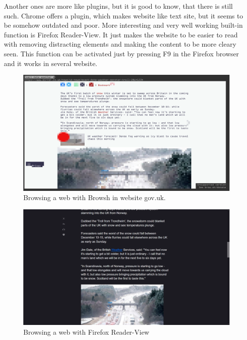 Another ones are more like plugins, but it is good to know, that there is still such. Chrome offers a plugin, which makes website like text site, but it seems to be somehow outdated and poor. More interesting and very well working built-in function is Firefox Reader-View. It just makes the website to be easier to read with removing distracting elements and making the content to be more cleary seen. This function can be activated just by pressing F9 in the Firefox browser and it works in several website.
\begin{figure}[tp]
    \centering
    \includegraphics[keepaspectratio,width=\linewidth,height=\halfh]
    {images/browsh.png}
    
    \caption[Browsh grahical CLI browser]
    {%
    Browsing a web with Browsh in website gov.uk.
    }
    \label{fig:browsh}
\end{figure}
\begin{figure}[tp]
    \centering
    \includegraphics[keepaspectratio,width=\linewidth,height=\halfh]
    {images/reader-view.png}
    
    \caption[Firefox Reader-View]
    {%
    Browsing a web with Firefox Reader-View
    }
    \label{fig:firefox-rv}
\end{figure}
